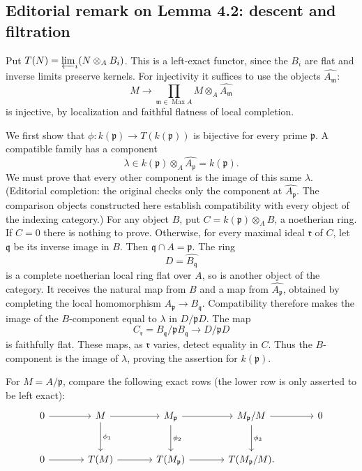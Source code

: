 \subsection*{Editorial remark on Lemma 4.2: descent and filtration}
Put $T(N)=\varprojlim_i(N\otimes_A B_i)$. This is a left-exact functor, since the $B_i$ are flat and inverse limits preserve kernels.
For injectivity it suffices to use the objects $\widehat{A_{\mathfrak m}}$:
\[
M\longrightarrow\prod_{\mathfrak m\in\operatorname{Max}A}
 M\otimes_A\widehat{A_{\mathfrak m}}
\]
is injective, by localization and faithful flatness of local completion.\par
We first show that $\phi\colon k(\mathfrak p)\to T(k(\mathfrak p))$ is bijective for every prime $\mathfrak p$. A compatible family has a component
\[
\lambda\in k(\mathfrak p)\otimes_A\widehat{A_{\mathfrak p}}
 =k(\mathfrak p).
\]
We must prove that every other component is the image of this same $\lambda$. (Editorial completion: the original checks only the component at $\widehat{A_{\mathfrak p}}$. The comparison objects constructed here establish compatibility with every object of the indexing category.)
For any object $B$, put $C=k(\mathfrak p)\otimes_A B$, a noetherian ring. If $C=0$ there is nothing to prove. Otherwise, for every maximal ideal $\mathfrak r$ of $C$, let $\mathfrak q$ be its inverse image in $B$. Then $\mathfrak q\cap A=\mathfrak p$. The ring
\[
D=\widehat{B_{\mathfrak q}}
\]
is a complete noetherian local ring flat over $A$, so is another object of the category. It receives the natural map from $B$ and a map from $\widehat{A_{\mathfrak p}}$, obtained by completing the local homomorphism $A_{\mathfrak p}\to B_{\mathfrak q}$. Compatibility therefore makes the image of the $B$-component equal to $\lambda$ in $D/\mathfrak pD$. The map
\[
C_{\mathfrak r}=B_{\mathfrak q}/\mathfrak pB_{\mathfrak q}
 \longrightarrow D/\mathfrak pD
\]
is faithfully flat. These maps, as $\mathfrak r$ varies, detect equality in $C$. Thus the $B$-component is the image of $\lambda$, proving the assertion for $k(\mathfrak p)$.\par
For $M=A/\mathfrak p$, compare the following exact rows (the lower row is only asserted to be left exact):
\[
\begin{tikzcd}[row sep=large,column sep=large]
0 \ar[r] & M \ar[r] \ar[d,"\phi_1"]
 & M_{\mathfrak p} \ar[r] \ar[d,"\phi_2"]
 & M_{\mathfrak p}/M \ar[r] \ar[d,"\phi_3"] & 0 \\
0 \ar[r] & T(M) \ar[r] & T(M_{\mathfrak p}) \ar[r]
 & T(M_{\mathfrak p}/M).
\end{tikzcd}
\]
